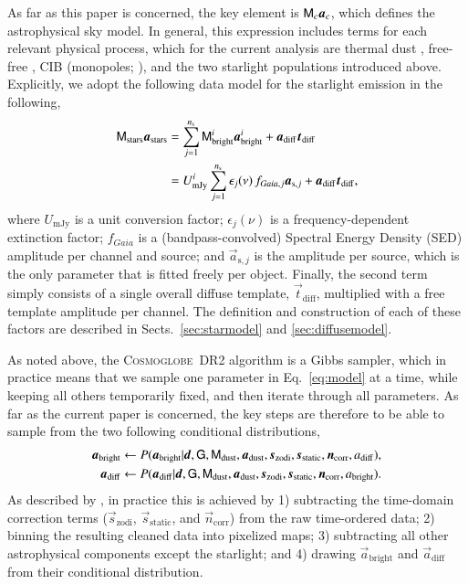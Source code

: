 \documentclass{aa}
\def\Cosmoglobe{\textsc{Cosmoglobe}}
\newcommand{\dv}[0]{\vec{d}}
\renewcommand{\t}[0]{\vec{t}}
\newcommand{\G}[0]{\tens{G}}
\newcommand{\n}[0]{\vec{n}}
\newcommand{\s}[0]{\vec{s}}
\renewcommand{\a}[0]{\vec{a}}
\newcommand{\M}[0]{\tens{M}}
\begin{document}
As far as this paper is concerned, the key element is $\M_c\a_c$, which defines the astrophysical sky model. In general, this expression includes terms for each relevant physical process, which for the current analysis are thermal dust \citep{CG02_05,CG02_06,CG02_07}, free-free \citep{dickinson2003,planck2014-a12}, CIB (monopoles; \citealp{DIRBE,CG02_03}), and the two starlight populations introduced above. Explicitly, we adopt the following data model for the starlight emission in the following,
\begin{align}
  \M_{\mathrm{stars}}\a_{\mathrm{stars}} &= \sum_{j=1}^{n_{\mathrm{s}}} \M^i_{\mathrm{bright}}\a^i_{\mathrm{bright}} + \a_{\mathrm{diff}}\t_{\mathrm{diff}}\\
  &= U^i_{\mathrm{mJy}} \sum_{j=1}^{n_{\mathrm{s}}} \epsilon_j(\nu)\,f_{\mathit{Gaia},j} \a_{\mathrm{s},j} + \a_{\mathrm{diff}}\t_{\mathrm{diff}},
  \label{eq:datamodel}
\end{align}
where $U_{\mathrm{mJy}}$ is a unit conversion factor;
$\epsilon_j(\nu)$ is a frequency-dependent extinction factor;
$f_{\mathit{Gaia}}$ is a (bandpass-convolved) Spectral Energy Density (SED) amplitude per
channel and source; and $\a_{\mathrm{s},j}$ is the amplitude per
source, which is the only parameter that is fitted freely per
object. Finally, the second term simply consists of a single overall
diffuse template, $\t_{\mathrm{diff}}$, multiplied with a free
template amplitude per channel. The definition and construction of
each of these factors are described in Sects.~\ref{sec:starmodel} and
\ref{sec:diffusemodel}.

As noted above, the \Cosmoglobe\ DR2 algorithm is a Gibbs sampler, which in practice means that we sample one parameter in Eq.~\ref{eq:model} at a time, while keeping all others temporarily fixed, and then iterate through all parameters. As far as the current paper is concerned, the key steps are therefore to be able to sample from the two following conditional distributions,
\begin{align}
  \a_{\mathrm{bright}} &\leftarrow P(\a_{\mathrm{bright}}| \dv, \G, \M_{\mathrm{dust}}, \a_{\mathrm{dust}}, \s_{\mathrm{zodi}}, \s_{\mathrm{static}}, \n_{\mathrm{corr}}, a_{\mathrm{diff}}), \\
  \a_{\mathrm{diff}} &\leftarrow P(\a_{\mathrm{diff}}|  \dv, \G, \M_{\mathrm{dust}}, \a_{\mathrm{dust}}, \s_{\mathrm{zodi}}, \s_{\mathrm{static}}, \n_{\mathrm{corr}}, a_{\mathrm{bright}}).
\end{align}
As described by \citet{CG02_01}, in practice this is achieved by 1) subtracting the time-domain correction terms ($\s_{\mathrm{zodi}}$, $\s_{\mathrm{static}}$, and $\n_{\mathrm{corr}}$) from the raw time-ordered data; 2) binning the resulting cleaned data into pixelized maps; 3) subtracting all other astrophysical components except the starlight; and 4) drawing $\a_{\mathrm{bright}}$ and $\a_{\mathrm{diff}}$ from their  conditional distribution.
\end{document}
